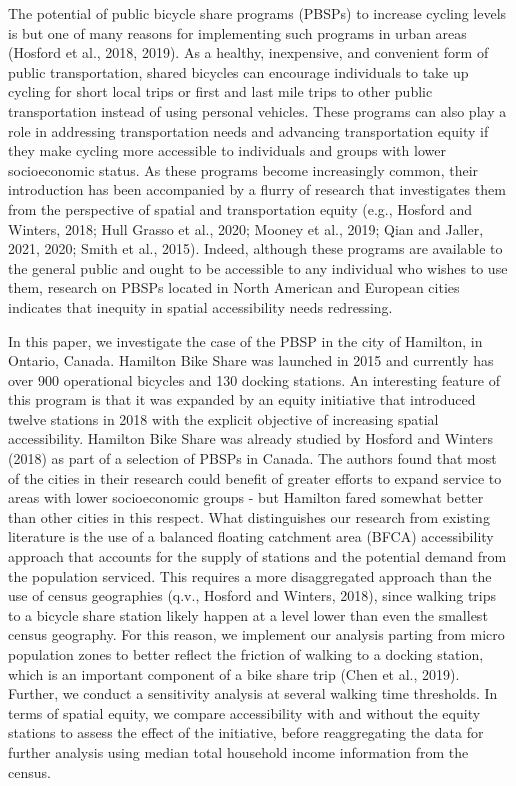 \documentclass[]{elsarticle} %
\begin{document}
The potential of public bicycle share programs (PBSPs) to increase
cycling levels is but one of many reasons for implementing such programs
in urban areas (Hosford et al., 2018, 2019). As a healthy, inexpensive,
and convenient form of public transportation, shared bicycles can
encourage individuals to take up cycling for short local trips or first
and last mile trips to other public transportation instead of using
personal vehicles. These programs can also play a role in addressing
transportation needs and advancing transportation equity if they make
cycling more accessible to individuals and groups with lower
socioeconomic status. As these programs become increasingly common,
their introduction has been accompanied by a flurry of research that
investigates them from the perspective of spatial and transportation
equity (e.g., Hosford and Winters, 2018; Hull Grasso et al., 2020;
Mooney et al., 2019; Qian and Jaller, 2021, 2020; Smith et al., 2015).
Indeed, although these programs are available to the general public and
ought to be accessible to any individual who wishes to use them,
research on PBSPs located in North American and European cities
indicates that inequity in spatial accessibility needs redressing.

In this paper, we investigate the case of the PBSP in the city of
Hamilton, in Ontario, Canada. Hamilton Bike Share was launched in 2015
and currently has over 900 operational bicycles and 130 docking
stations. An interesting feature of this program is that it was expanded
by an equity initiative that introduced twelve stations in 2018 with the
explicit objective of increasing spatial accessibility. Hamilton Bike
Share was already studied by Hosford and Winters (2018) as part of a
selection of PBSPs in Canada. The authors found that most of the cities
in their research could benefit of greater efforts to expand service to
areas with lower socioeconomic groups - but Hamilton fared somewhat
better than other cities in this respect. What distinguishes our
research from existing literature is the use of a balanced floating
catchment area (BFCA) accessibility approach that accounts for the
supply of stations and the potential demand from the population
serviced. This requires a more disaggregated approach than the use of
census geographies (q.v., Hosford and Winters, 2018), since walking
trips to a bicycle share station likely happen at a level lower than
even the smallest census geography. For this reason, we implement our
analysis parting from micro population zones to better reflect the
friction of walking to a docking station, which is an important
component of a bike share trip (Chen et al., 2019). Further, we conduct
a sensitivity analysis at several walking time thresholds. In terms of
spatial equity, we compare accessibility with and without the equity
stations to assess the effect of the initiative, before reaggregating
the data for further analysis using median total household income
information from the census.
\end{document}
